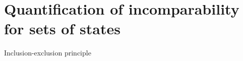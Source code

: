 \section{Quantification of incomparability for sets of states}

\begin{frame}{Inclusion-exclusion principle}
    
\end{frame}